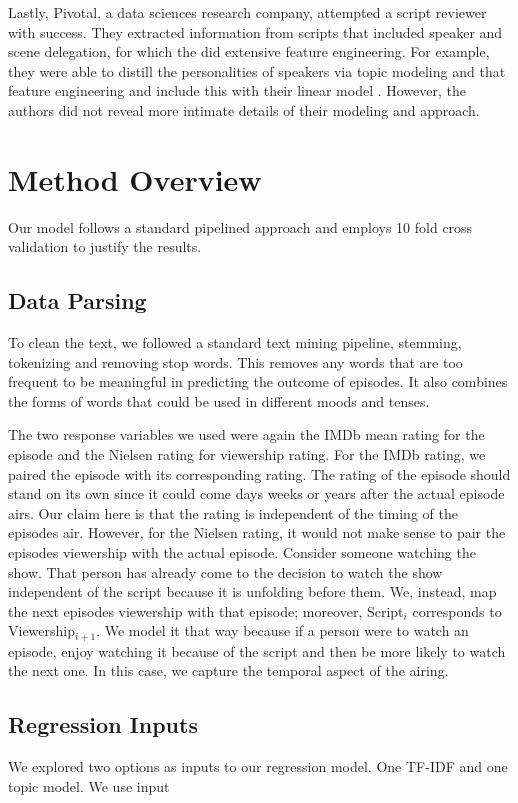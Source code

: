 \documentclass{sig-alternate-05-2015}
\begin{document}
Lastly, Pivotal, a data sciences research company, attempted a script reviewer with success. They extracted information from scripts that included speaker and scene delegation, for which the did extensive feature engineering. For example, they were able to distill the personalities of speakers via topic modeling and that feature engineering and include this with their linear model \cite{Pivotal}. However, the authors did not reveal more intimate details of their modeling and approach.  

\section{Method Overview}
Our model follows a standard pipelined approach and employs 10 fold cross validation to justify the results.

\subsection{Data Parsing}
To clean the text, we followed a standard text mining pipeline, stemming, tokenizing and removing stop words. This removes any words that are too frequent to be meaningful in predicting the outcome of episodes. It also combines the forms of words that could be used in different moods and tenses.

The two response variables we used were again the IMDb mean rating for the episode and the Nielsen rating for viewership rating. For the IMDb rating, we paired the episode with its corresponding rating. The rating of the episode should stand on its own since it could come days weeks or years after the actual episode airs. Our claim here is that the rating is independent of the timing of the episodes air. However, for the Nielsen rating, it would not make sense to pair the episodes viewership with the actual episode. Consider someone watching the show. That person has already come to the decision to watch the show independent of the script because it is unfolding before them. We, instead, map the next episodes viewership with that episode; moreover, Script$_i$ corresponds to Viewership$_{i+1}$. We model it that way because if a person were to watch an episode, enjoy watching it because of the script and then be more likely to watch the next one. In this case, we capture the temporal aspect of the airing.

\subsection{Regression Inputs}
We explored two options as inputs to our regression model. One TF-IDF and one topic model. We use input
\end{document}
